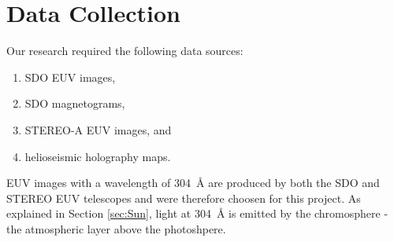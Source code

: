 \documentclass[11pt,a4paper,onecolumn]{report}
\begin{document}
  



\section{Data Collection}
Our research required the following data sources:
\begin{enumerate}
  \item SDO EUV images,
  \item SDO magnetograms,
  \item STEREO-A EUV images, and
  \item helioseismic holography maps.
\end{enumerate}
EUV images with a wavelength of \SI{304}{\angstrom} are produced by both the SDO
and STEREO EUV telescopes and were therefore choosen for this project. As explained in
Section \ref{sec:Sun}, light at \SI{304}{\angstrom} is emitted by the
chromosphere - the atmospheric layer above the photoshpere. \\
\end{document}
